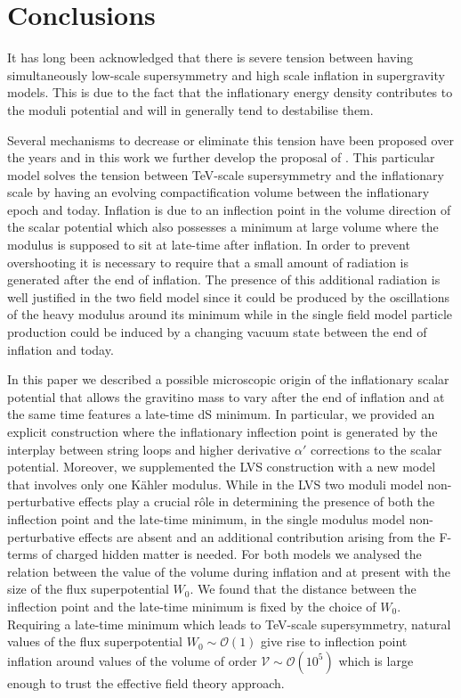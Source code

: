 \documentclass[11pt,a4paper]{article}
\newcommand\vo{{\mathcal{V}}}
\newcommand\mc{\mathcal}
\begin{document}
\section{Conclusions}
\label{SecConcl}

It has long been acknowledged that there is severe tension between having simultaneously low-scale supersymmetry and high scale inflation in supergravity models. This is due to the fact that the inflationary energy density contributes to the moduli potential and will in generally tend to destabilise them.

Several mechanisms to decrease or eliminate this tension have been proposed over the years and in this work we further develop the proposal of \cite{Conlon:2008cj}. This particular model solves the tension between TeV-scale supersymmetry and the inflationary scale by having an evolving compactification volume between the inflationary epoch and today. Inflation is due to an inflection point in the volume direction of the scalar potential which also possesses a minimum at large volume where the modulus is supposed to sit at late-time after inflation. In order to prevent overshooting it is necessary to require that a small amount of radiation is generated after the end of inflation. The presence of this additional radiation is well justified in the two field model since it could be produced by the oscillations of the heavy modulus around its minimum while in the single field model particle production could be induced by a changing vacuum state between the end of inflation and today. 

In this paper we described a possible microscopic origin of the inflationary scalar potential that allows the gravitino mass to vary after the end of inflation and at the same time features a late-time dS minimum. In particular, we provided an explicit construction where the inflationary inflection point is generated by the interplay between string loops and higher derivative $\alpha'$ corrections to the scalar potential. Moreover, we supplemented the LVS construction with a new model that involves only one K\"ahler modulus. While in the LVS two moduli model non-perturbative effects play a crucial r\^ole in determining the presence of both the inflection point and the late-time minimum, in the single modulus model non-perturbative effects are absent and an additional contribution arising from the F-terms of charged hidden matter is needed. For both models we analysed the relation between the value of the volume during inflation and at present with the size of the flux superpotential $W_0$. We found that the distance between the inflection point and the late-time minimum is fixed by the choice of $W_0$. Requiring a late-time minimum which leads to TeV-scale supersymmetry, natural values of the flux superpotential $W_0\sim \mc{O}(1)$ give rise to inflection point inflation around values of the volume of order $\vo\sim\mc{O}(10^5)$ which is large enough to trust the effective field theory approach. 
\end{document}
